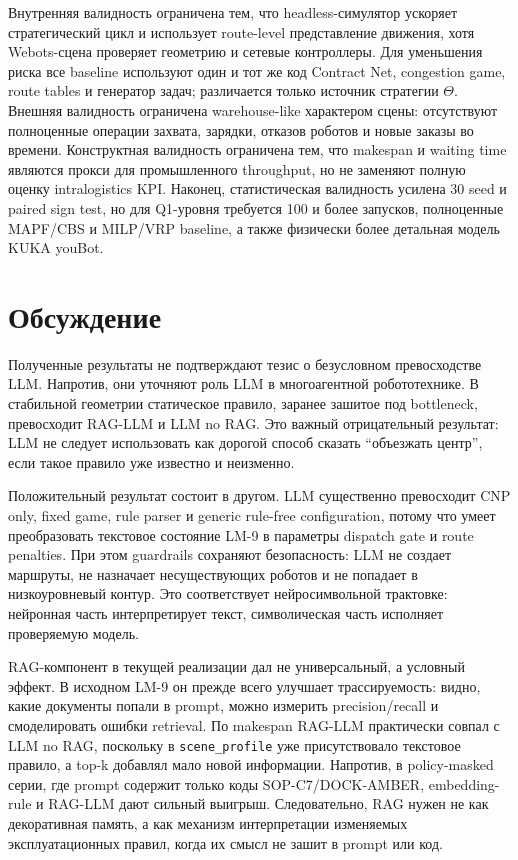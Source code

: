 \documentclass[runningheads]{llncs}
\begin{document}
Внутренняя валидность ограничена тем, что headless-симулятор ускоряет стратегический цикл и использует route-level представление движения, хотя Webots-сцена проверяет геометрию и сетевые контроллеры. Для уменьшения риска все baseline используют один и тот же код Contract Net, congestion game, route tables и генератор задач; различается только источник стратегии $\Theta$. Внешняя валидность ограничена warehouse-like характером сцены: отсутствуют полноценные операции захвата, зарядки, отказов роботов и новые заказы во времени. Конструктная валидность ограничена тем, что makespan и waiting time являются прокси для промышленного throughput, но не заменяют полную оценку intralogistics KPI. Наконец, статистическая валидность усилена 30 seed и paired sign test, но для Q1-уровня требуется 100 и более запусков, полноценные MAPF/CBS и MILP/VRP baseline, а также физически более детальная модель KUKA youBot.

\section{Обсуждение}

Полученные результаты не подтверждают тезис о безусловном превосходстве LLM. Напротив, они уточняют роль LLM в многоагентной робототехнике. В стабильной геометрии статическое правило, заранее зашитое под bottleneck, превосходит RAG-LLM и LLM no RAG. Это важный отрицательный результат: LLM не следует использовать как дорогой способ сказать ``объезжать центр'', если такое правило уже известно и неизменно.

Положительный результат состоит в другом. LLM существенно превосходит CNP only, fixed game, rule parser и generic rule-free configuration, потому что умеет преобразовать текстовое состояние LM-9 в параметры dispatch gate и route penalties. При этом guardrails сохраняют безопасность: LLM не создает маршруты, не назначает несуществующих роботов и не попадает в низкоуровневый контур. Это соответствует нейросимвольной трактовке: нейронная часть интерпретирует текст, символическая часть исполняет проверяемую модель.

RAG-компонент в текущей реализации дал не универсальный, а условный эффект. В исходном LM-9 он прежде всего улучшает трассируемость: видно, какие документы попали в prompt, можно измерить precision/recall и смоделировать ошибки retrieval. По makespan RAG-LLM практически совпал с LLM no RAG, поскольку в \texttt{scene\_profile} уже присутствовало текстовое правило, а top-k добавлял мало новой информации. Напротив, в policy-masked серии, где prompt содержит только коды SOP-C7/DOCK-AMBER, embedding-rule и RAG-LLM дают сильный выигрыш. Следовательно, RAG нужен не как декоративная память, а как механизм интерпретации изменяемых эксплуатационных правил, когда их смысл не зашит в prompt или код.
\end{document}
